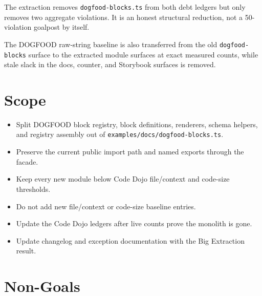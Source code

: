 The extraction removes \texttt{d\allowbreak{}o\allowbreak{}g\allowbreak{}f\allowbreak{}o\allowbreak{}o\allowbreak{}d\allowbreak{}-\allowbreak{}b\allowbreak{}l\allowbreak{}o\allowbreak{}c\allowbreak{}k\allowbreak{}s\allowbreak{}.\allowbreak{}t\allowbreak{}s} from both debt ledgers but only removes two aggregate violations. It is an honest structural reduction, not a 50-violation goalpost by itself.

The DOGFOOD raw-string baseline is also transferred from the old \texttt{d\allowbreak{}o\allowbreak{}g\allowbreak{}f\allowbreak{}o\allowbreak{}o\allowbreak{}d\allowbreak{}-\allowbreak{}b\allowbreak{}l\allowbreak{}o\allowbreak{}c\allowbreak{}k\allowbreak{}s} surface to the extracted module surfaces at exact measured counts, while stale slack in the docs, counter, and Storybook surfaces is removed.

\section{Scope}\label{record-253-scope}

\begin{itemize}
\tightlist
\item
  Split DOGFOOD block registry, block definitions, renderers, schema helpers, and registry assembly out of \texttt{e\allowbreak{}x\allowbreak{}a\allowbreak{}m\allowbreak{}p\allowbreak{}l\allowbreak{}e\allowbreak{}s\allowbreak{}/\allowbreak{}d\allowbreak{}o\allowbreak{}c\allowbreak{}s\allowbreak{}/\allowbreak{}d\allowbreak{}o\allowbreak{}g\allowbreak{}f\allowbreak{}o\allowbreak{}o\allowbreak{}d\allowbreak{}-\allowbreak{}b\allowbreak{}l\allowbreak{}o\allowbreak{}c\allowbreak{}k\allowbreak{}s\allowbreak{}.\allowbreak{}t\allowbreak{}s}.
\item
  Preserve the current public import path and named exports through the facade.
\item
  Keep every new module below Code Dojo file/context and code-size thresholds.
\item
  Do not add new file/context or code-size baseline entries.
\item
  Update the Code Dojo ledgers after live counts prove the monolith is gone.
\item
  Update changelog and exception documentation with the Big Extraction result.
\end{itemize}

\section{Non-Goals}\label{record-253-non-goals}

